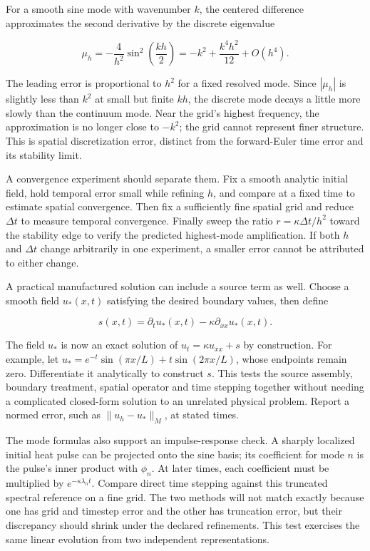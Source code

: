 \hypertarget{02-foundations-ii-ch025-spatial-and-temporal-error-have-different-signatures}{}

For a smooth sine mode with wavenumber \(k\), the centered difference approximates the second derivative by the discrete eigenvalue

\[
\mu_h=-\frac{4}{h^2}\sin^2\left(\frac{kh}{2}\right)
=-k^2+\frac{k^4h^2}{12}+O(h^4).
\]

The leading error is proportional to \(h^2\) for a fixed resolved mode. Since \(|\mu_h|\) is slightly less than \(k^2\) at small but finite \(kh\), the discrete mode decays a little more slowly than the continuum mode. Near the grid's highest frequency, the approximation is no longer close to \(-k^2\); the grid cannot represent finer structure. This is spatial discretization error, distinct from the forward-Euler time error and its stability limit.

A convergence experiment should separate them. Fix a smooth analytic initial field, hold temporal error small while refining \(h\), and compare at a fixed time to estimate spatial convergence. Then fix a sufficiently fine spatial grid and reduce \(\Delta t\) to measure temporal convergence. Finally sweep the ratio \(r=\kappa\Delta t/h^2\) toward the stability edge to verify the predicted highest-mode amplification. If both \(h\) and \(\Delta t\) change arbitrarily in one experiment, a smaller error cannot be attributed to either change.

A practical manufactured solution can include a source term as well. Choose a smooth field \(u_*(x,t)\) satisfying the desired boundary values, then define

\[
s(x,t)=\partial_tu_*(x,t)-\kappa\partial_{xx}u_*(x,t).
\]

The field \(u_*\) is now an exact solution of \(u_t=\kappa u_{xx}+s\) by construction. For example, let \(u_*=e^{-t}\sin(\pi x/L)+t\sin(2\pi x/L)\), whose endpoints remain zero. Differentiate it analytically to construct \(s\). This tests the source assembly, boundary treatment, spatial operator and time stepping together without needing a complicated closed-form solution to an unrelated physical problem. Report a normed error, such as \(\|u_h-u_*\|_M\), at stated times.

The mode formulas also support an impulse-response check. A sharply localized initial heat pulse can be projected onto the sine basis; its coefficient for mode \(n\) is the pulse's inner product with \(\phi_n\). At later times, each coefficient must be multiplied by \(e^{-\kappa\lambda_nt}\). Compare direct time stepping against this truncated spectral reference on a fine grid. The two methods will not match exactly because one has grid and timestep error and the other has truncation error, but their discrepancy should shrink under the declared refinements. This test exercises the same linear evolution from two independent representations.

